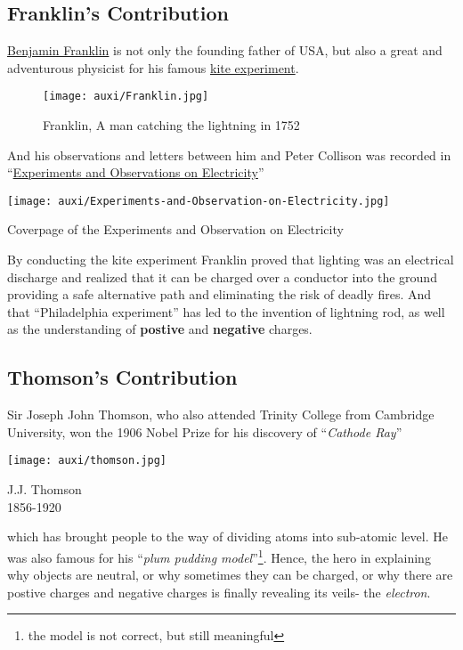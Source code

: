 \documentclass[a4paper]{tufte-handout}
\begin{document}
\subsection{Franklin's Contribution}
\href{https://www.fi.edu/benjamin-franklin/kite-key-experiment}{Benjamin Franklin} is not only the founding father of USA, but also a great and adventurous physicist for his famous \href{https://history.howstuffworks.com/history-vs-myth/did-benjamin-franklin-use-kite-to-discover-electricity.htm}{kite experiment}. 
\begin{figure}[h]
\texttt{[image: auxi/Franklin.jpg]}
\caption{Franklin, A man catching the lightning in 1752}
\end{figure}
And his observations and letters between him and Peter Collison was recorded in ``\href{http://www.benjamin-franklin-history.org/experiments-with-electricity/#:~:text=Experiments%20with%20electricity%201%20The%20Leyden%20Jar%20The,Franklin’s%20letters%20about%20his%20experiments%20with%20electricity%20}{Experiments and Observations on Electricity}''
\begin{marginfigure}
\texttt{[image: auxi/Experiments-and-Observation-on-Electricity.jpg]}
\caption{Coverpage of the Experiments and Observation on Electricity}
\end{marginfigure}
By conducting the kite experiment Franklin proved that lighting was an electrical discharge and realized that it can be charged over a conductor into the ground providing a safe alternative path and eliminating the risk of deadly fires.
And that ``Philadelphia experiment'' has led to the invention of lightning rod, as well as the understanding of \textbf{postive} and \textbf{negative} charges.

\subsection{Thomson's Contribution}
Sir Joseph John Thomson, who also attended Trinity College from Cambridge University, won the 1906 Nobel Prize for his discovery of ``\emph{Cathode Ray}'' 
\begin{marginfigure}[3cm] %
\texttt{[image: auxi/thomson.jpg]}
\caption{J.J. Thomson\\1856-1920}
\end{marginfigure}
which has brought people to the way of dividing atoms into sub-atomic level. He was also famous for his ``\emph{plum pudding model}''\footnote{the model is not correct, but still meaningful}. Hence, the hero in explaining why objects are neutral, or why sometimes they can be charged, or why there are postive charges and negative charges is finally revealing its veils- the \emph{electron}.
\end{document}
